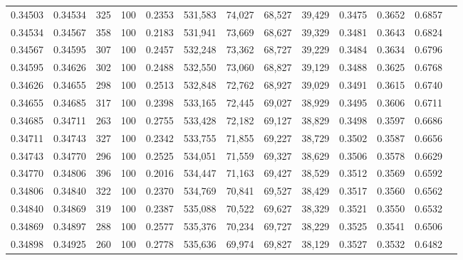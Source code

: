 \begin{tabular}{rrrrrrrrrrrrr}
0.34503 & 0.34534 &   325 & 100 &                                     0.2353 & 531,583 &  74,027 &  68,527 &  39,429 & 0.3475 & 0.3652 & 0.6857 \\
0.34534 & 0.34567 &   358 & 100 &                                     0.2183 & 531,941 &  73,669 &  68,627 &  39,329 & 0.3481 & 0.3643 & 0.6824 \\
0.34567 & 0.34595 &   307 & 100 &                                     0.2457 & 532,248 &  73,362 &  68,727 &  39,229 & 0.3484 & 0.3634 & 0.6796 \\
0.34595 & 0.34626 &   302 & 100 &                                     0.2488 & 532,550 &  73,060 &  68,827 &  39,129 & 0.3488 & 0.3625 & 0.6768 \\
0.34626 & 0.34655 &   298 & 100 &                                     0.2513 & 532,848 &  72,762 &  68,927 &  39,029 & 0.3491 & 0.3615 & 0.6740 \\
0.34655 & 0.34685 &   317 & 100 &                                     0.2398 & 533,165 &  72,445 &  69,027 &  38,929 & 0.3495 & 0.3606 & 0.6711 \\
0.34685 & 0.34711 &   263 & 100 &                                     0.2755 & 533,428 &  72,182 &  69,127 &  38,829 & 0.3498 & 0.3597 & 0.6686 \\
0.34711 & 0.34743 &   327 & 100 &                                     0.2342 & 533,755 &  71,855 &  69,227 &  38,729 & 0.3502 & 0.3587 & 0.6656 \\
0.34743 & 0.34770 &   296 & 100 &                                     0.2525 & 534,051 &  71,559 &  69,327 &  38,629 & 0.3506 & 0.3578 & 0.6629 \\
0.34770 & 0.34806 &   396 & 100 &                                     0.2016 & 534,447 &  71,163 &  69,427 &  38,529 & 0.3512 & 0.3569 & 0.6592 \\
0.34806 & 0.34840 &   322 & 100 &                                     0.2370 & 534,769 &  70,841 &  69,527 &  38,429 & 0.3517 & 0.3560 & 0.6562 \\
0.34840 & 0.34869 &   319 & 100 &                                     0.2387 & 535,088 &  70,522 &  69,627 &  38,329 & 0.3521 & 0.3550 & 0.6532 \\
0.34869 & 0.34897 &   288 & 100 &                                     0.2577 & 535,376 &  70,234 &  69,727 &  38,229 & 0.3525 & 0.3541 & 0.6506 \\
0.34898 & 0.34925 &   260 & 100 &                                     0.2778 & 535,636 &  69,974 &  69,827 &  38,129 & 0.3527 & 0.3532 & 0.6482 \\

\end{tabular}
